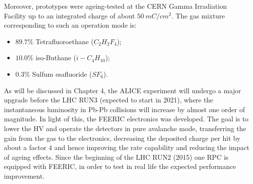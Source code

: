 Moreover, prototypes were ageing-tested at the CERN Gamma Irradiation Facility up to an integrated charge of about $50\ mC/cm^2$.
The gas mixture corresponding to such an operation mode is:
\begin{itemize}
    \item $89.7\%$ Tetrafluoroethane ($C_2H_2F_4$);
    \item $10.0\%$ iso-Buthane ($i-C_4H_{10}$);
    \item $0.3\%$ Sulfum esafluoride ($SF_6$).
\end{itemize}
As will be discussed in Chapter 4, the ALICE experiment will undergo a major upgrade before the LHC RUN3 (expected to start in 2021), where the instantaneous luminosity in Pb-Pb collisions will increase by almost one order of magnitude. 
In light of this, the FEERIC electronics was developed. 
The goal is to lower the HV and operate the detectors in pure avalanche mode, transferring the gain from the gas to the electronics, decreasing the deposited charge per hit by about a factor $4$ and hence improving the rate capability and reducing the impact of ageing effects. 
Since the beginning of the LHC RUN2 (2015) one RPC is equipped with FEERIC, in order to test in real life the expected performance improvement.
